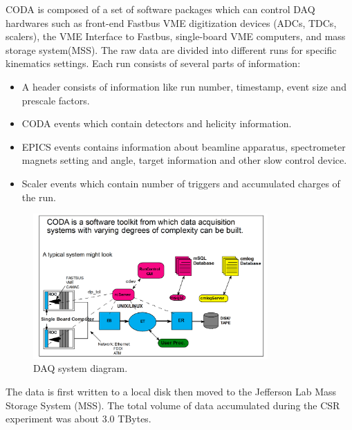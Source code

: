 CODA is composed of a set of software packages which can control DAQ hardwares such as front-end Fastbus VME digitization
devices (ADCs, TDCs, scalers), the VME Interface to Fastbus, single-board VME computers, and mass storage system(MSS).
The raw data are divided into different runs for specific kinematics settings. Each run consists of several parts of
information:
\begin{itemize}
\item A header consists of information like run number, timestamp, event size and prescale factors.
\item CODA events which contain detectors and helicity information.
\item EPICS events contains information about beamline apparatus, spectrometer magnets setting and angle, target information
and other slow control device.
\item Scaler events which contain number of triggers and accumulated charges of the run.
\end{itemize}

\begin{figure}[tb!]
\centering
\includegraphics[width=0.8\textwidth]{figs/DAQ_diagram.png}
\caption[DAQ system diagram]{DAQ system diagram.  \label{fig:daq_diagram}}
\end{figure}

The data is first written to a local disk then moved to the Jefferson Lab Mass Storage System (MSS).
The total volume of data accumulated during the CSR experiment was about 3.0 TBytes.
%
%
%
%
%
